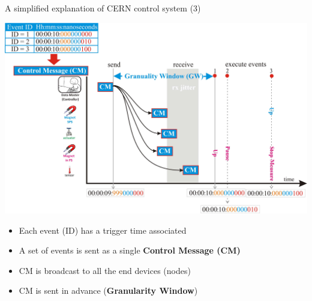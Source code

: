\documentclass[compress,red]{beamer}
\begin{document}
\begin{frame}{A simplified explanation of CERN control system (3)}

      \begin{center}
      \includegraphics[width=.8\textwidth]{applications/CERN/event3.pdf}
      \end{center}

  \begin{itemize}
    \item Each event (ID) has a trigger time associated
	\item A set of events is sent as a single {\bf Control Message (CM)}
	\item CM is broadcast to all the end devices (nodes)
	\item CM is sent in advance ({\bf Granularity Window})
  \end{itemize}

\end{frame}
\end{document}
